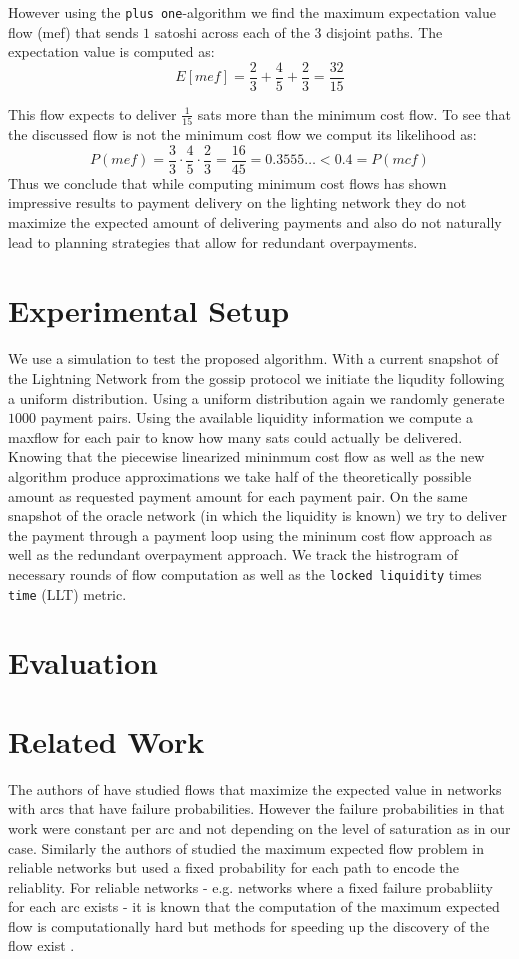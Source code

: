 \documentclass[10pt,twocolumn]{article}
\begin{document}
However using the \texttt{plus one}-algorithm we find the maximum expectation value flow (mef) that sends $1$ satoshi across each of the $3$ disjoint paths.
The expectation value is computed as:
\[
E[mef] = \frac{2}{3} + \frac{4}{5} + \frac{2}{3} = \frac{32}{15}
\]

This flow expects to deliver $\frac{1}{15}$ sats more than the minimum cost flow.
To see that the discussed flow is not the minimum cost flow we comput its likelihood as:
\[
P(mef) = \frac{3}{3} \cdot \frac{4}{5} \cdot \frac{2}{3} = \frac{16}{45} = 0.3555\dots < 0.4 = P(mcf)
\]
Thus we conclude that while computing minimum cost flows has shown impressive results to payment delivery on the lighting network they do not maximize the expected amount of delivering payments and also do not naturally lead to planning strategies that allow for redundant overpayments.

\section{Experimental Setup}
We use a simulation to test the proposed algorithm.
With a current snapshot of the Lightning Network from the gossip protocol we initiate the liqudity following a uniform distribution.
Using a uniform distribution again we randomly generate $1000$ payment pairs.
Using the available liquidity information we compute a maxflow for each pair to know how many sats could actually be delivered.
Knowing that the piecewise linearized mininmum cost flow as well as the new algorithm produce approximations we take half of the theoretically possible amount as requested payment amount for each payment pair.
On the same snapshot of the oracle network (in which the liquidity is known) we try to deliver the payment through a payment loop using the mininum cost flow approach as well as the redundant overpayment approach.
We track the histrogram of necessary rounds of flow computation as well as the \texttt{locked liquidity} times \texttt{time} (LLT) metric.

\section{Evaluation}

\section{Related Work}
The authors of \cite{aneja1980maximal} have studied flows that maximize the expected value in networks with arcs that have failure probabilities.
However the failure probabilities in that work were constant per arc and not depending on the level of saturation as in our case.
Similarly the authors of \cite{sancho1988maximum} studied the maximum expected flow problem in reliable networks but used a fixed probability for each path to encode the reliablity.
For reliable networks - e.g. networks where a fixed failure probabliity for each arc exists - it is known that the computation of the maximum expected flow is computationally hard but methods for speeding up the discovery of the flow exist \cite{sharma2013speeding}.
\end{document}
